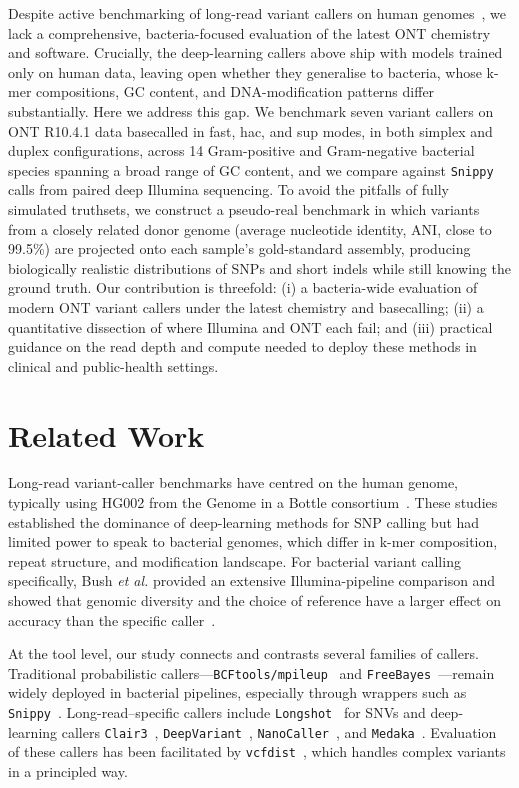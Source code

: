 \documentclass[11pt]{article}
\begin{document}
Despite active benchmarking of long-read variant callers on human genomes~\citep{olson2022giab}, we lack a comprehensive, bacteria-focused evaluation of the latest ONT chemistry and software. Crucially, the deep-learning callers above ship with models trained only on human data, leaving open whether they generalise to bacteria, whose k-mer compositions, GC content, and DNA-modification patterns differ substantially. Here we address this gap. We benchmark seven variant callers on ONT R10.4.1 data basecalled in fast, hac, and sup modes, in both simplex and duplex configurations, across 14 Gram-positive and Gram-negative bacterial species spanning a broad range of GC content, and we compare against \texttt{Snippy}~\citep{seemann_snippy} calls from paired deep Illumina sequencing. To avoid the pitfalls of fully simulated truthsets, we construct a pseudo-real benchmark in which variants from a closely related donor genome (average nucleotide identity, ANI, close to 99.5\%) are projected onto each sample's gold-standard assembly, producing biologically realistic distributions of SNPs and short indels while still knowing the ground truth. Our contribution is threefold: (i) a bacteria-wide evaluation of modern ONT variant callers under the latest chemistry and basecalling; (ii) a quantitative dissection of where Illumina and ONT each fail; and (iii) practical guidance on the read depth and compute needed to deploy these methods in clinical and public-health settings.

\section{Related Work}

Long-read variant-caller benchmarks have centred on the human genome, typically using HG002 from the Genome in a Bottle consortium~\citep{olson2022giab}. These studies established the dominance of deep-learning methods for SNP calling but had limited power to speak to bacterial genomes, which differ in k-mer composition, repeat structure, and modification landscape. For bacterial variant calling specifically, Bush \emph{et al.} provided an extensive Illumina-pipeline comparison and showed that genomic diversity and the choice of reference have a larger effect on accuracy than the specific caller~\citep{bush2020genomic}.

At the tool level, our study connects and contrasts several families of callers. Traditional probabilistic callers---\texttt{BCFtools/mpileup}~\citep{danecek2021bcftools} and \texttt{FreeBayes}~\citep{garrison2012freebayes}---remain widely deployed in bacterial pipelines, especially through wrappers such as \texttt{Snippy}~\citep{seemann_snippy}. Long-read--specific callers include \texttt{Longshot}~\citep{edge2019longshot} for SNVs and deep-learning callers \texttt{Clair3}~\citep{zheng2022clair3}, \texttt{DeepVariant}~\citep{poplin2018deepvariant}, \texttt{NanoCaller}~\citep{ahsan2021nanocaller}, and \texttt{Medaka}~\citep{ont_medaka}. Evaluation of these callers has been facilitated by \texttt{vcfdist}~\citep{dunn2024vcfdist}, which handles complex variants in a principled way.
\end{document}
